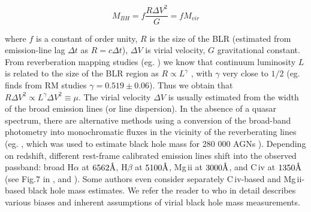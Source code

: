 \documentclass[twocolumn]{aastex62}
\let\oldAA\AA
\renewcommand{\AA}{\text{\normalfont\oldAA}}
\begin{document}
\begin{equation}
M_{BH} = f \frac{ R\Delta V^{2} }{G} = f M_{vir}
\end{equation}


where $f$ is a constant of order unity, $R$ is the size of the BLR (estimated from  emission-line lag $\Delta t$ as $R = c \Delta t$), $\Delta V$ is virial velocity, $G$ gravitational constant.  From reverberation mapping studies (eg. \citealt{shen2018}) we know that continuum luminosity $L$ is related to the size of the BLR region as $R \propto L^{\gamma}$ \citep{vestergaard2006}, with $\gamma$ very close to $1/2$ (eg. \citealt{bentz2009} finds from RM studies $\gamma = 0.519 \pm 0.06$). Thus we obtain  that $R \Delta V^{2} \propto L^{\gamma} \Delta V^{2} \equiv \mu$. The virial velocity $\Delta V$ is usually estimated from the width of the broad emission lines (or line dispersion).  In the absence of a quasar spectrum, there are alternative methods using a conversion of the broad-band photometry into monochromatic fluxes in the vicinity of the reverberating lines (eg. \citealt{kozlowski2015}, which was used to estimate black hole mass for 280 000 AGNs \citealt{kozlowski2017b}).   
Depending on redshift, different rest-frame calibrated emission lines shift into the observed passband: broad H$\alpha$ at  $6562\mbox{\AA}$, H$\beta$ at  $5100 \mbox{\AA}$, Mg\,{\sc ii} at $3000\mbox{\AA}$, and C\,{\sc iv} at $1350\mbox{\AA}$ (see Fig.7 in \citealt{shen2018}, and \citealt{vestergaard2002}). Some authors even consider separately C\,{\sc iv}-based and  Mg\,{\sc ii}-based  black hole mass estimates. We refer the reader to \citet{shen2008} who in detail describes various biases and inherent assumptions of virial black hole mass measurements. 
\end{document}
